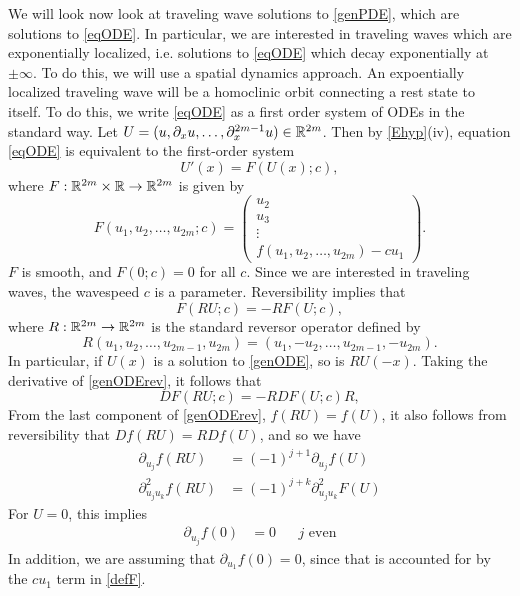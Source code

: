 \documentclass[thesis.tex]{subfiles}
\begin{document}
We will look now look at traveling wave solutions to \cref{genPDE}, which are solutions to \cref{eqODE}. In particular, we are interested in traveling waves which are exponentially localized, i.e. solutions to \cref{eqODE} which decay exponentially at $\pm \infty$. To do this, we will use a spatial dynamics approach. An expoentially localized traveling wave will be a homoclinic orbit connecting a rest state to itself. To do this, we write \cref{eqODE} as a first order system of ODEs in the standard way. Let $U = (u, \partial_x u, \dots, \partial_x^{2m-1} u) \in \mathbb{R}^{2m}$. Then by \cref{Ehyp}(iv), equation \cref{eqODE} is equivalent to the first-order system
\begin{equation}\label{genODE}
U'(x) = F(U(x); c),
\end{equation}
where $F: \mathbb{R}^{2m} \times \mathbb{R} \rightarrow \mathbb{R}^{2m}$ is given by
\begin{equation}\label{defF}
F(u_1, u_2, \dots, u_{2m}; c) = 
\begin{pmatrix}
u_2 \\ u_3 \\ \vdots \\ f(u_1, u_2, \dots, u_{2m}) - c u_1
\end{pmatrix}.
\end{equation}
$F$ is smooth, and $F(0; c) = 0$ for all $c$. Since we are interested in traveling waves, the wavespeed $c$ is a parameter. Reversibility implies that
\begin{equation}\label{genODErev}
F(RU; c) = -RF(U; c),
\end{equation}
where $R:\mathbb{R}^{2m} \rightarrow \mathbb{R}^{2m}$ is the standard reversor operator defined by
\begin{equation}\label{reverserR2m}
R(u_1, u_2, \dots, u_{2m-1}, u_{2m}) = (u_1, -u_2, \dots, u_{2m-1}, -u_{2m}).
\end{equation}
In particular, if $U(x)$ is a solution to \cref{genODE}, so is $RU(-x)$. Taking the derivative of \ref{genODErev}, it follows that 
\begin{equation}\label{genODErevDF}
D F(RU; c) = -RDF(U; c)R,
\end{equation}
From the last component of \eqref{genODErev}, $f(RU) = f(U)$, it also follows from reversibility that $Df(RU) = RDf(U)$, and so we have
\begin{equation}\label{frev}
\begin{aligned}
\partial_{u_j} f(R U) &= (-1)^{j+1} \partial_{u_j} f(U) \\
\partial^2_{u_j u_k} f(R U) &= (-1)^{j+k} \partial^2_{u_j u_k} F(U)
\end{aligned}
\end{equation}
For $U = 0$, this implies
\begin{align}\label{fpartials0}
\partial_{u_j} f(0) &= 0 && j \text{ even}
\end{align}
In addition, we are assuming that $\partial_{u_1} f(0) = 0$, since that is accounted for by the $c u_1$ term in \cref{defF}. 
\end{document}
